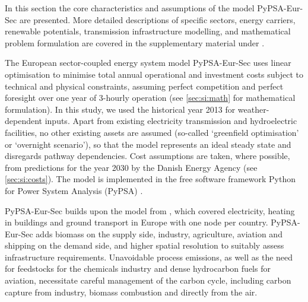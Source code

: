 In this section the core characteristics and assumptions of the model
PyPSA-Eur-Sec are presented. More detailed descriptions of specific sectors,
energy carriers, renewable potentials, transmission infrastructure modelling,
and mathematical problem formulation are covered in the supplementary material
under .

The European sector-coupled energy system model PyPSA-Eur-Sec uses linear
optimisation to minimise total annual operational and investment costs subject
to technical and physical constraints, assuming perfect competition and perfect
foresight over one year of 3-hourly operation (see \cref{sec:si:math} for
mathematical formulation). In this study, we used the historical year 2013 for
weather-dependent inputs. Apart from existing electricity transmission and
hydroelectric facilities, no other existing assets are assumed (so-called
`greenfield optimisation' or `overnight scenario'), so that the model represents
an ideal steady state and disregards pathway dependencies.  Cost assumptions are
taken, where possible, from predictions for the year 2030 by the Danish Energy
Agency \cite{dea2019} (see \cref{sec:si:costs}). The model is implemented in the
free software framework Python for Power System Analysis (PyPSA)
\cite{brownPyPSAPython2018}.

PyPSA-Eur-Sec builds upon the model from \cite{brownSynergiesSector2018}, which
covered electricity, heating in buildings and ground transport in Europe with
one node per country. PyPSA-Eur-Sec adds biomass on the supply side, industry,
agriculture, aviation and shipping on the demand side, and higher spatial
resolution to suitably assess infrastructure requirements. Unavoidable process
emissions, as well as the need for feedstocks for the chemicals industry and
dense hydrocarbon fuels for aviation, necessitate careful management of the
carbon cycle, including carbon capture from industry, biomass combustion and
directly from the air.

